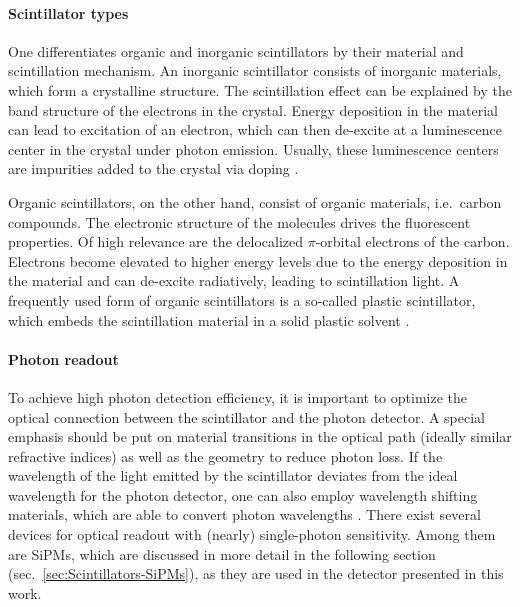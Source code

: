 \paragraph{Scintillator types}
One differentiates organic and inorganic scintillators by their material and scintillation mechanism. An inorganic scintillator consists of inorganic materials, which form a crystalline structure. The scintillation effect can be explained by the band structure of the electrons in the crystal. Energy deposition in the material can lead to excitation of an electron, which can then de-excite at a luminescence center in the crystal under photon emission. Usually, these luminescence centers are impurities added to the crystal via doping \cite{Book-KolanoskiWermes,Book-Leo}.
\par Organic scintillators, on the other hand, consist of organic materials, i.e.\ carbon compounds. The electronic structure of the molecules drives the fluorescent properties. Of high relevance are the delocalized $\pi$-orbital electrons of the carbon. Electrons become elevated to higher energy levels due to the energy deposition in the material and can de-excite radiatively, leading to scintillation light. A frequently used form of organic scintillators is a so-called plastic scintillator, which embeds the scintillation material in a solid plastic solvent \cite{Book-KolanoskiWermes,Book-Leo}.
\paragraph{Photon readout}
To achieve high photon detection efficiency, it is important to optimize the optical connection between the scintillator and the photon detector. A special emphasis should be put on material transitions in the optical path (ideally similar refractive indices) as well as the geometry to reduce photon loss. If the wavelength of the light emitted by the scintillator deviates from the ideal wavelength for the photon detector, one can also employ wavelength shifting materials, which are able to convert photon wavelengths \cite{Book-KolanoskiWermes,Book-Leo}. There exist several devices for optical readout with (nearly) single-photon sensitivity. Among them are \acp{SiPM}, which are discussed in more detail in the following section (sec.\ \ref{sec:Scintillators-SiPMs}), as they are used in the detector presented in this work.

